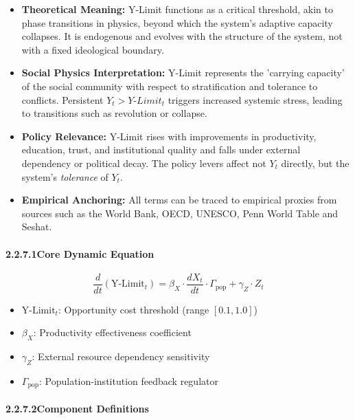 \documentclass[12pt]{report}
\begin{document}
\begin{itemize}
  \item \textbf{Theoretical Meaning:} Y-Limit functions as a critical threshold, akin to phase transitions in physics, beyond which the system's adaptive capacity collapses. It is endogenous and evolves with the structure of the system, not with a fixed ideological boundary.
  
  \item \textbf{Social Physics Interpretation:} Y-Limit represents the 'carrying capacity' of the social community with respect to stratification and tolerance to conflicts. Persistent $Y_t > Y\text{-}Limit_t$ triggers increased systemic stress, leading to transitions such as revolution or collapse.
  
  \item \textbf{Policy Relevance:} Y-Limit rises with improvements in productivity, education, trust, and institutional quality and falls under external dependency or political decay. The policy levers affect not $Y_t$ directly, but the system’s \textit{tolerance} of $Y_t$.
  
  \item \textbf{Empirical Anchoring:} All terms can be traced to empirical proxies from sources such as the World Bank, OECD, UNESCO, Penn World Table and Seshat.
\end{itemize}

\paragraph{2.2.7.1\quad Core Dynamic Equation}

\[
\frac{d}{dt}(\text{Y-Limit}_t) = \beta_X \cdot \frac{dX_t}{dt} \cdot \Gamma_{\text{pop}} + \gamma_Z \cdot Z_t
\]

\begin{itemize}
  \item $\text{Y-Limit}_t$: Opportunity cost threshold (range $[0.1, 1.0]$)
  \item $\beta_X$: Productivity effectiveness coefficient
  \item $\gamma_Z$: External resource dependency sensitivity
  \item $\Gamma_{\text{pop}}$: Population-institution feedback regulator
\end{itemize}

\paragraph{2.2.7.2\quad Component Definitions}
\end{document}
